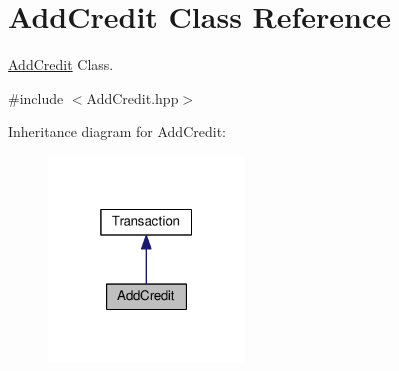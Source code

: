 \hypertarget{class_add_credit}{\section{Add\-Credit Class Reference}
\label{class_add_credit}
}


\hyperlink{class_add_credit}{Add\-Credit} Class.  




{\ttfamily \#include $<$Add\-Credit.\-hpp$>$}



Inheritance diagram for Add\-Credit\-:\nopagebreak
\begin{figure}[H]
\begin{center}
\leavevmode
\includegraphics[width=148pt]{class_add_credit__inherit__graph}
\end{center}
\end{figure}


